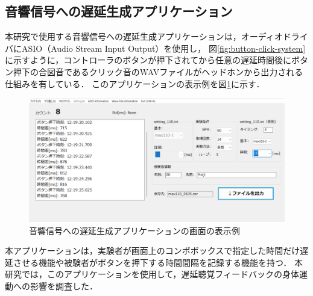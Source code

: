 \subsection{音響信号への遅延生成アプリケーション}
本研究で使用する音響信号への遅延生成アプリケーションは，オーディオドライバにASIO（Audio Stream Input Output）を使用し，
図\ref{fig:button-click-system}に示すように，コントローラのボタンが押下されてから任意の遅延時間後にボタン押下の合図音であるクリック音のWAVファイルがヘッドホンから出力される仕組みを有している．
このアプリケーションの表示例を図\ref{fig:app_kyakkann}に示す．
\begin{figure}[tbp]
  \centering
  \includegraphics[scale=0.22]{figures/Apprication/App_kyakkann.pdf}
  \caption{音響信号への遅延生成アプリケーションの画面の表示例}
  \label{fig:app_kyakkann}
\end{figure}
本アプリケーションは，実験者が画面上のコンボボックスで指定した時間だけ遅延させる機能や被験者がボタンを押下する時間間隔を記録する機能を持つ．
本研究では，このアプリケーションを使用して，遅延聴覚フィードバックの身体運動への影響を調査した．
